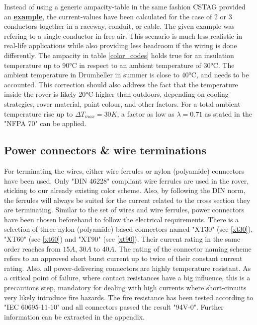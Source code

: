     Instead of using a generic ampacity-table in the same fashion CSTAG provided an \href{https://web.archive.org/web/20230310184047/https://www.coonerwire.com/amp-chart/}{\textbf{\underline{example}}}, the current-values have been calculated for the case of 2 or 3 conductors together in a raceway, conduit, or cable. The given example was refering to a single conductor in free air. This scenario is much less realistic in real-life applications while also providing less headroom if the wiring is done differently. The ampacity in table \ref{color_codes} holds true for an insulation temperature up to 90°C in respect to an ambient temperature of 30°C. The ambient temperature in Drumheller in summer is close to 40°C, and needs to be accounted. This correction should also address the fact that the temperature inside the rover is likely 20°C higher than outdoors, depending on cooling strategies, rover material, paint colour, and other factors. For a total ambient temperature rise up to $\Delta T_{max} = 30K$, a factor as low as $\lambda = 0.71$ as stated in the "NFPA 70" can be applied.


    \clearpage %

    \subsection{Power connectors \& wire terminations}

    
    For terminating the wires, either wire ferrules or nylon (polyamide) connectors have been used. Only "DIN 46228" compliant wire ferrules are used in the rover, sticking to our already existing color scheme. Also, by following the DIN norm, the ferrules will always be suited for the current related to the cross section they are terminating. Similar to the set of wires and wire ferrules, power connectors have been chosen beforehand to follow the electrical requirements. There is a selection of three nylon (polyamide) based connectors named "XT30" (see \ref{xt30}), "XT60" (see \ref{xt60}) and "XT90" (see \ref{xt90}). Their current rating in the same order reaches from $15A$, $30A$ to $40A$. The rating of the connector naming scheme refers to an approved short burst current up to twice of their constant current rating. Also, all power-delivering connectors are highly temperature resistant. As a critical point of failure, where contact resistances have a big influence, this is a precautions step, mandatory for dealing with high currents where short-circuits very likely introduce fire hazards. The fire resistance has been tested according to "IEC 60695-11-10" and all connectors passed the result "94V-0". Further information can be extracted in the appendix.

